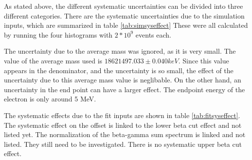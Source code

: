 \documentclass[main.tex]{subfiles}
\begin{document}
As stated above, the different systematic uncertainties can be divided into three different categories. 
There are the systematic uncertainties due to the simulation inputs, which are summarized in table \ref{tab:simsyseffect}
These were all calculated by running the four histograms with $2 * 10^{9}$ events each.

\begin{table}[!hbt]
	\centering
	\caption{Systematic uncertainties due to simulation inputs}
		\label{tab:simsyseffect}
\end{table}

The uncertainty due to the average mass was ignored, as it is very small.
The value of the average mass used is $18621497.033 \pm 0.040 keV$.
Since this value appears in the denominator, and the uncertainty is so small, the effect of the uncertainty due to this average mass value is neglibable. 
On the other hand, an uncertainty in the end point can have a larger effect.
The endpoint energy of the electron is only around 5 MeV.  

The systematic effects due to the fit inputs are shown in table \ref{tab:fitsyseffect}.
The systematic effect on the offset is linked to the lower beta cut effect and not listed yet.
The normalization of the beta-gamma sum spectrum is linked and not listed.
They still need to be investigated.
There is no systematic upper beta cut effect.

\begin{table}[!hbt]
	\centering
	\caption{Systematic uncertainties due to fit inputs} 
		\label{tab:fitsyseffect}
\end{table}
\end{document}
